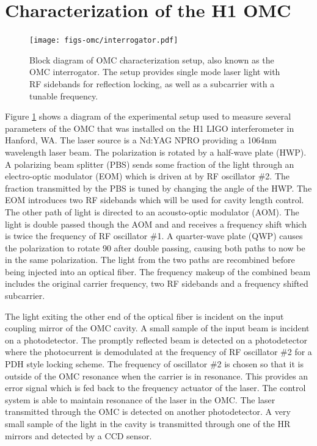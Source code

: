 \section{Characterization of the H1 OMC}
\begin{figure}
  \begin{center}
  \leavevmode
  \texttt{[image: figs-omc/interrogator.pdf]}
  \end{center}
  \caption[Block diagram of OMC characterization setup.]{Block diagram of OMC characterization setup, also known as the OMC interrogator. The setup provides single mode laser light with RF sidebands for reflection locking, as well as a subcarrier with a tunable frequency.}
  \label{fig:interrogator}
\end{figure}

Figure \ref{fig:interrogator} shows a diagram of the experimental setup used to measure several parameters of the OMC that was installed on the H1 LIGO interferometer in Hanford, WA. %
The laser source is a Nd:YAG NPRO providing a 1064nm wavelength laser beam. %
The polarization is rotated by a half-wave plate (HWP). %
A polarizing beam splitter (PBS) sends some fraction of the light through an electro-optic modulator (EOM) which is driven at by RF oscillator \#2. %
The fraction transmitted by the PBS is tuned by changing the angle of the HWP. %
The EOM introduces two RF sidebands which will be used for cavity length control. %
The other path of light is directed to an acousto-optic modulator (AOM). %
The light is double passed though the AOM and and receives a frequency shift which is twice the frequency of RF oscillator \#1. %
A quarter-wave plate (QWP) causes the polarization to rotate 90\degrees{} after double passing, causing both paths to now be in the same polarization. %
The light from the two paths are recombined before being injected into an optical fiber. %
The frequency makeup of the combined beam includes the original carrier frequency, two RF sidebands and a frequency shifted subcarrier.

The light exiting the other end of the optical fiber is incident on the input coupling mirror of the OMC cavity. %
A small sample of the input beam is incident on a photodetector. %
The promptly reflected beam is detected on a photodetector where the photocurrent is demodulated at the frequency of RF oscillator \#2 for a PDH style locking scheme. %
The frequency of oscillator \#2 is chosen so that it is outside of the OMC resonance when the carrier is in resonance. %
This provides an error signal which is fed back to the frequency actuator of the laser. %
The control system is able to maintain resonance of the laser in the OMC. %
The laser transmitted through the OMC is detected on another photodetector. %
A very small sample of the light in the cavity is transmitted through one of the HR mirrors and detected by a CCD sensor.

